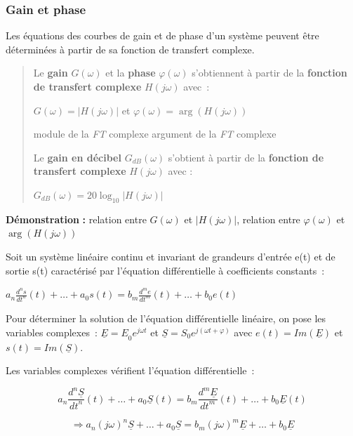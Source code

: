 \hypertarget{gain-et-phase}{%
\subsubsection{Gain et phase}\label{gain-et-phase}}

Les équations des courbes de gain et de phase d'un système peuvent être déterminées à partir de sa fonction de transfert complexe.

\begin{quote}
Le \textbf{gain} \(G(\omega)\) et la \textbf{phase} \(\varphi(\omega)\) s'obtiennent à partir de la \textbf{fonction de transfert complexe} \(H(j\omega)\) avec~:

\(G(\omega) = \left| H(j\omega) \right|\) et \(\varphi(\omega) = \arg\left( H(j\omega) \right)\)

module de la \emph{FT} complexe argument de la \emph{FT} complexe

Le \textbf{gain en décibel} \(G_{dB}(\omega)\) s'obtient à partir de la \textbf{fonction de transfert complexe} \(H(j\omega)\) avec :

\(G_{dB}(\omega) = 20\log_{10}\left| H(j\omega) \right|\)
\end{quote}

\textbf{Démonstration} \textbf{:} relation entre \(G(\omega)\) et \(\left| H(j\omega) \right|\), relation entre \(\varphi(\omega)\) et \(\arg\left( H(j\omega) \right)\)

Soit un système linéaire continu et invariant de grandeurs d'entrée e(t) et de sortie s(t) caractérisé par l'équation différentielle à coefficients constants~:

\(a_{n}\frac{d^{n}s}{{dt}^{n}}(t) + \ldots + a_{0}s(t) = b_{m}\frac{d^{m}e}{{dt}^{m}}(t) + \ldots + b_{0}e(t)\)

Pour déterminer la solution de l'équation différentielle linéaire, on pose les variables complexes~: \({\underline{E} = E}_{0}e^{j\omega t}\) et \(\underline{S} = S_{0}e^{j(\omega t + \varphi)}\) avec \(e(t) = Im(\underline{E})\) et \(s(t) = Im(\underline{S})\).

Les variables complexes vérifient l'équation différentielle~:

\[a_{n}\frac{d^{n}\underline{S}}{{dt}^{n}}(t) + \ldots + a_{0}\underline{S}(t) = b_{m}\frac{d^{m}\underline{E}}{{dt}^{m}}(t) + \ldots + b_{0}\underline{E}(t)\]

\[{\Longrightarrow a}_{n}(j\omega)^{n}\underline{S} + \ldots + a_{0}\underline{S} = b_{m}(j\omega)^{m}\underline{E} + \ldots + b_{0}\underline{E}\]

